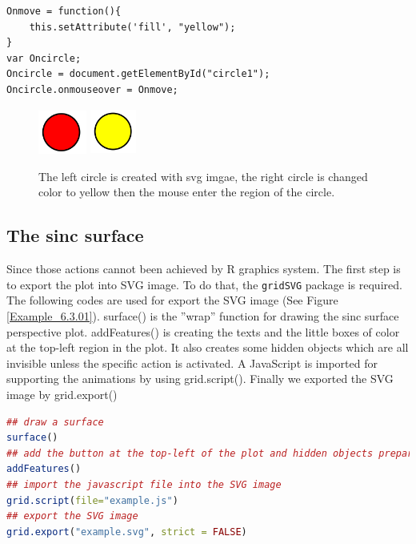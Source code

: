 \documentclass{report}
\begin{document}
\begin{lstlisting}
Onmove = function(){
    this.setAttribute('fill', "yellow");
}
var Oncircle;
Oncircle = document.getElementById("circle1");
Oncircle.onmouseover = Onmove;
\end{lstlisting}

\begin{figure}[h]
	\begin{center}
		\includegraphics[height = 1.45cm, width = 1.6cm]{figure/svg/svgdemo0.PNG}
		\hspace{4cm}
		\includegraphics[height = 1.5cm, width = 1.5cm]{figure/svg/svgdemo1.PNG}
		\caption{The left circle is created with svg imgae, the right circle is changed color to yellow then the mouse enter the region of the circle. }
		\label{Example_6.3.0}
	\end{center}
\end{figure}

\subsection{The sinc surface}
Since those actions cannot been achieved by R graphics system. The first step is to export the plot into
SVG image. To do that, the \texttt{gridSVG} package is required. The following codes are used for export the SVG image (See Figure \ref{Example_6.3.01}). surface() is the ''wrap'' function for drawing the sinc surface perspective plot.
addFeatures() is creating the texts and the little boxes of color at the top-left region in the plot.
It also creates some hidden objects which are all invisible unless the specific action is activated. A
JavaScript is imported for supporting the animations by using grid.script(). Finally we exported
the SVG image by grid.export()
\\

\begin{lstlisting}[language = R]
## draw a surface
surface()  
## add the button at the top-left of the plot and hidden objects prepare for animation
addFeatures() 
## import the javascript file into the SVG image
grid.script(file="example.js") 
## export the SVG image
grid.export("example.svg", strict = FALSE) 
\end{lstlisting}
\end{document}
